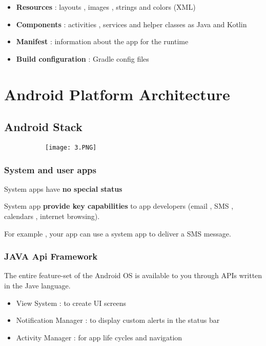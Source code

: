 \documentclass{article}
\begin{document}
\begin{itemize}
    \item \textbf{Resources} : layouts , images , strings and colors (XML) 
    \item \textbf{Components} : activities , services and helper classes as Java and Kotlin
    \item \textbf{Manifest} : information about the app for the runtime
    \item \textbf{Build configuration} : Gradle config files
\end{itemize}

\section{Android Platform Architecture}

\subsection{Android Stack}

\begin{figure}[ht!]
  \centering
  \begin{subfigure}[b]{0.6\linewidth}
    \texttt{[image: 3.PNG]}
  \end{subfigure}
\end{figure}

\subsubsection{System and user apps}

System apps have \textbf{no special status}

System app \textbf{provide key capabilities} to app developers (email , SMS , calendars , internet browsing).

For example , your app can use a system app to deliver a SMS message.

\subsubsection{JAVA Api Framework}

The entire feature-set of the Android OS is available to you through APIs written in the Jave language.

\begin{itemize}
    \item View System : to create UI screens
    \item Notification Manager : to display custom alerts in the status bar
    \item Activity Manager : for app life cycles and navigation
\end{itemize}
\end{document}
